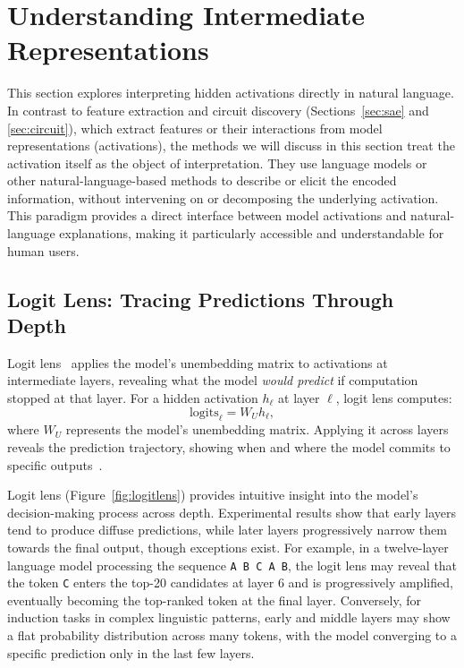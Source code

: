 \section{Understanding Intermediate Representations}
\label{sec:intermediate-computation}

This section explores interpreting hidden activations directly in natural language. In contrast to feature extraction and circuit discovery (Sections~\ref{sec:sae} and \ref{sec:circuit}), which extract features or their interactions from model representations (activations), the methods we will discuss in this section treat the activation itself as the object of interpretation. They use language models or other natural-language-based methods to describe or elicit the encoded information, without intervening on or decomposing the underlying activation. This paradigm provides a direct interface between model activations and natural-language explanations, making it particularly accessible and understandable for human users.


\subsection{Logit Lens: Tracing Predictions Through Depth}
\label{sec:logit-lens}

\begin{definitionbox}
Logit lens~ applies the model's unembedding matrix to activations at intermediate layers, revealing what the model \emph{would predict} if computation stopped at that layer. For a hidden activation $h_\ell$ at layer $\ell$, logit lens computes:
\[
\text{logits}_\ell = W_U h_\ell,
\]
where $W_U$ represents the model's unembedding matrix. Applying it across layers reveals the prediction trajectory, showing when and where the model commits to specific outputs~.
\end{definitionbox}

Logit lens (Figure~\ref{fig:logitlens}) provides intuitive insight into the model's decision-making process across depth. Experimental results show that early layers tend to produce diffuse predictions, while later layers progressively narrow them towards the final output, though exceptions exist. For example, in a twelve-layer language model processing the sequence \texttt{A B C A B}, the logit lens may reveal that the token \texttt{C} enters the top-20 candidates at layer 6 and is progressively amplified, eventually becoming the top-ranked token at the final layer. Conversely, for induction tasks in complex linguistic patterns, early and middle layers may show a flat probability distribution across many tokens, with the model converging to a specific prediction only in the last few layers.

